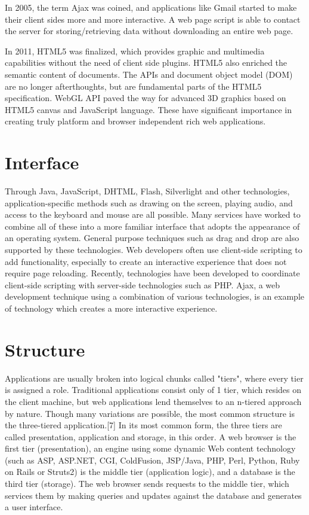 In 2005, the term Ajax was coined, and applications like Gmail started to make their client sides more and more interactive. A web page script is able to contact the server for storing/retrieving data without downloading an entire web page.

In 2011, HTML5 was finalized, which provides graphic and multimedia capabilities without the need of client side plugins. HTML5 also enriched the semantic content of documents. The APIs and document object model (DOM) are no longer afterthoughts, but are fundamental parts of the HTML5 specification. WebGL API paved the way for advanced 3D graphics based on HTML5 canvas and JavaScript language. These have significant importance in creating truly platform and browser independent rich web applications.






\section{Interface}

Through Java, JavaScript, DHTML, Flash, Silverlight and other technologies, application-specific methods such as drawing on the screen, playing audio, and access to the keyboard and mouse are all possible. Many services have worked to combine all of these into a more familiar interface that adopts the appearance of an operating system. General purpose techniques such as drag and drop are also supported by these technologies. Web developers often use client-side scripting to add functionality, especially to create an interactive experience that does not require page reloading. Recently, technologies have been developed to coordinate client-side scripting with server-side technologies such as PHP. Ajax, a web development technique using a combination of various technologies, is an example of technology which creates a more interactive experience.








\section{Structure}

Applications are usually broken into logical chunks called "tiers", where every tier is assigned a role. Traditional applications consist only of 1 tier, which resides on the client machine, but web applications lend themselves to an n-tiered approach by nature. Though many variations are possible, the most common structure is the three-tiered application.[7] In its most common form, the three tiers are called presentation, application and storage, in this order. A web browser is the first tier (presentation), an engine using some dynamic Web content technology (such as ASP, ASP.NET, CGI, ColdFusion, JSP/Java, PHP, Perl, Python, Ruby on Rails or Struts2) is the middle tier (application logic), and a database is the third tier (storage). The web browser sends requests to the middle tier, which services them by making queries and updates against the database and generates a user interface.

